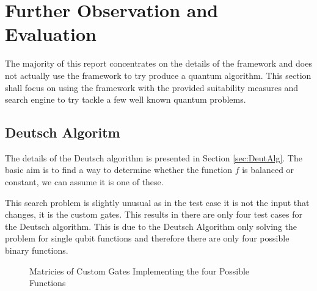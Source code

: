 \chapter{Further Observation and Evaluation}

The majority of this report concentrates on the details of the framework and does not actually use the framework to try produce a quantum algorithm.
This section shall focus on using the framework with the provided suitability measures and search engine to try tackle a few well known quantum problems.

\section{Deutsch Algoritm}
The details of the Deutsch algorithm is presented in Section \ref{sec:DeutAlg}.
The basic aim is to find a way to determine whether the function $f$ is balanced or constant, we can assume it is one of these.

This search problem is slightly unusual as in the test case it is not the input that changes, it is the custom gates.
This results in there are only four test cases for the Deutsch algorithm.
This is due to the Deutsch Algorithm only solving the problem for single qubit functions and therefore there are only four possible binary functions.



\begin{figure}
\centering
{}
\caption{Matricies of Custom Gates Implementing the four Possible Functions}
 \label{fig:deutschfunctions}
\end{figure}

